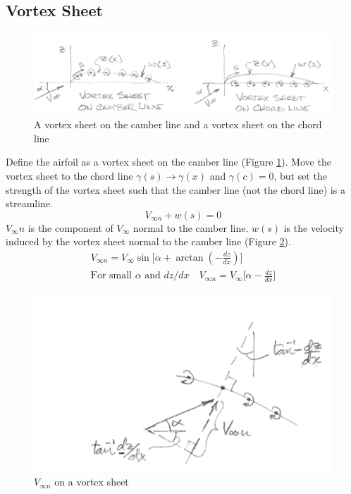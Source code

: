 \documentclass[draft=false, titlepage]{article}
\begin{document}
\subsection{Vortex Sheet}
\begin{figure}[ht]
    \centering
    \includegraphics[width=0.8\linewidth]{Figures/vortexSheetOnLine.PNG}
    \caption{A vortex sheet on the camber line and a vortex sheet on the chord line}
    \label{fig:vortexSheetOnLine}
\end{figure}
Define the airfoil as a vortex sheet on the camber line (Figure \ref{fig:vortexSheetOnLine}). Move the vortex sheet to the chord line $\gamma(s) \rightarrow \gamma(x)$ and $\gamma (c) = 0$, but set the strength of the vortex sheet such that the camber line (not the chord line) is a streamline.
\begin{equation*}
    V_{\infty n} + w(s) = 0
\end{equation*}
$V_\infty n$ is the component of $V_\infty$ normal to the camber line. $w(s)$ is the velocity induced by the vortex sheet normal to the camber line (Figure \ref{fig:vortexSheetDifferential}).
\begin{gather*}
    V_{\infty n} = V_\infty \sin\big[ \alpha + \arctan(-\frac{dz}{dx})\big]\\
    \text{For small } \alpha \text{ and } dz/dx \quad V_{\infty n} = V_\infty \big[\alpha - \frac{dz}{dx}\big]
\end{gather*}
\begin{figure}[ht]
    \centering
    \includegraphics[width=0.4\linewidth]{Figures/vortexSheetDifferential.PNG}
    \caption{$V_{\infty n}$ on a vortex sheet}
    \label{fig:vortexSheetDifferential}
\end{figure}
\end{document}
